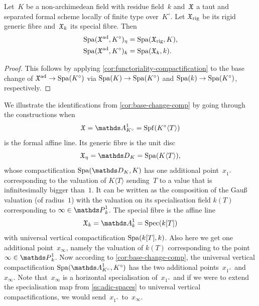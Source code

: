 \begin{cor} \label{cor:base-change-comp}
    Let~$K$ be a non-archimedean field with residue field~$k$ and~${\mathfrak{X}}$ a taut and separated formal scheme locally of finite type over~$K^\circ$.
    Let ${\mathfrak{X}}_{\rm rig}$ be its rigid generic fibre and~${\mathfrak{X}}_k$ its special fibre.
    Then
    \begin{align*}
     \operatorname{Spa}({\mathfrak{X}}^{\rm ad},K^\circ)_\eta &= \operatorname{Spa}({\mathfrak{X}}_{\rm rig},K),   \\
     \operatorname{Spa}({\mathfrak{X}}^{\rm ad},K^\circ)_k &= \operatorname{Spa}({\mathfrak{X}}_k,k).
    \end{align*}
\end{cor}

\begin{proof}
    This follows by applying \cref{cor:functoriality-compactification} to the base change of ${\mathfrak{X}}^{\rm ad} \to \operatorname{Spa}(K^\circ)$ via $\operatorname{Spa}(K) \to \operatorname{Spa}(K^\circ)$ and $\operatorname{Spa}(k) \to \operatorname{Spa}(K^\circ)$, respectively.
\end{proof}

\begin{ex} \label{ex:comp-disk}
    We illustrate the identifications from  \cref{cor:base-change-comp} by going through the constructions when
    \[
        \fX = \bA^1_{K^\circ} =  \Spf (K^\circ \langle T \rangle)
    \]
    is the formal affine line.
    Its generic fibre is the unit disc
    \[
        \fX_\eta = \bD_K = \Spa (K \langle T \rangle),
    \]
    whose compactification $\Spa(\bD_K,K)$ has one additional point~$x_{1^+}$ corresponding to the valuation of $K \langle T \rangle$ sending~$T$ to a value that is infinitesimally bigger than~$1$.
    It can be written as the composition of the Gauß valuation (of radius~$1$) with the valuation on its specialisation field $k(T)$ corresponding to $\infty \in \bP^1_k$.
    The special fibre is the affine line
    \[
        \fX_k = \bA^1_k = \Spec (k[T])
    \]
    with universal vertical compactification $\operatorname{Spa}(k[T],k)$.
    Also here we get one additional point~$x_{\infty}$, namely the valuation of $k(T)$ corresponding to the point $\infty \in \bP^1_k$.
    Now according to \cref{cor:base-change-comp}, the universal vertical compactification $\Spa(\bA^1_{K^\circ},K^\circ)$ has the two additional points~$x_{1^+}$ and~$x_\infty$.
    Note that~$x_\infty$ is a horizontal specialisation of~$x_{1^+}$ and if we were to extend the specialisation map from \cref{ss:adic-spaces} to universal vertical compactifications, we would send~$x_{1^+}$ to~$x_\infty$.
\end{ex}


